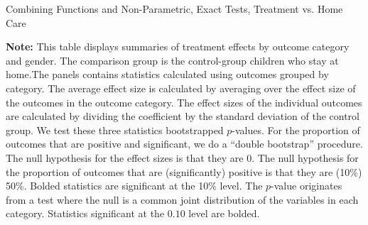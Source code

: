 \begin{table}[!htpb]
\begin{threeparttable}
\caption{Combining Functions and Non-Parametric, Exact Tests, Treatment vs. Home Care} \label{table:massivehome}
\centering
  
\begin{tablenotes}
\footnotesize
\item  \footnotesize \textbf{Note:} This table displays summaries of treatment effects by outcome category and gender. The comparison group is the control-group children who stay at home.The panels contains statistics calculated using outcomes grouped by category. The average effect size is calculated by averaging over the effect size of the outcomes in the outcome category. The effect sizes of the individual outcomes are calculated by dividing the coefficient by the standard deviation of the control group. We test these three statistics bootstrapped $p$-values. For the proportion of outcomes that are positive and significant, we do a ``double bootstrap'' procedure. The null hypothesis for the effect sizes is that they are 0. The null hypothesis for the proportion of outcomes that are (significantly) positive is that they are (10\%) 50\%. Bolded statistics are significant at the 10\% level. The \citet{Rosenbaum_2005_Distribution_JRSS} $p$-value originates from a test where the null is a common joint distribution of the variables in each category. Statistics significant at the $0.10$ level are bolded.
\end{tablenotes}
\end{threeparttable}
\end{table}

